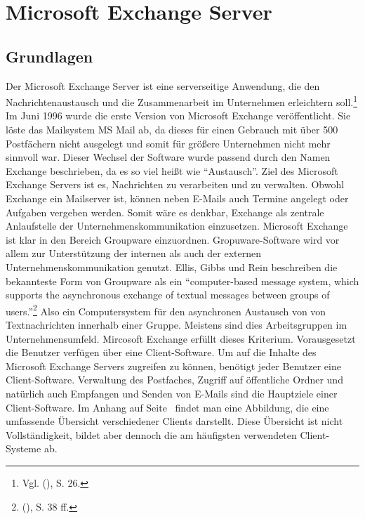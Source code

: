 \section{Microsoft Exchange Server}

\subsection{Grundlagen}
\noindent 
Der  Microsoft Exchange Server ist eine serverseitige Anwendung, die den Nachrichtenaustausch und die Zusammenarbeit im Unternehmen erleichtern soll.\footnote{Vgl. \citeauthor{Joos} (\citeyear{Joos}), S. 26.} Im Juni 1996 wurde die erste Version von Microsoft Exchange veröffentlicht. Sie löste das Mailsystem MS Mail ab, da dieses für einen Gebrauch mit über 500 Postfächern nicht ausgelegt und somit für größere Unternehmen nicht mehr sinnvoll war. Dieser Wechsel der Software wurde passend durch den Namen Exchange beschrieben, da es so viel heißt wie \enquote{Austausch}. Ziel des Microsoft Exchange Servers ist es, Nachrichten zu verarbeiten und zu verwalten. Obwohl Exchange ein Mailserver ist, können neben E-Mails auch Termine angelegt oder Aufgaben vergeben werden. Somit wäre es denkbar, Exchange als zentrale Anlaufstelle der Unternehmenskommunikation einzusetzen.\newline
Microsoft Exchange ist klar in den Bereich Groupware einzuordnen. Gropuware-Software wird vor allem zur Unterstützung der internen als auch der externen Unternehmenskommunikation genutzt. Ellis, Gibbs und Rein beschreiben die bekannteste Form von Groupware als ein 
\enquote{computer-based message system, which supports the asynchronous exchange of textual messages between groups of users.}\footnote{\citeauthor{Ellis} (\citeyear{Ellis}), S. 38 ff.} Also ein Computersystem für den asynchronen Austausch von von Textnachrichten innerhalb einer Gruppe. Meistens sind dies Arbeitsgruppen im Unternehmensumfeld. Mircosoft Exchange erfüllt dieses Kriterium. Vorausgesetzt die Benutzer verfügen über eine Client-Software.\newline
Um auf die Inhalte des Microsoft Exchange Servers zugreifen zu können, benötigt jeder Benutzer eine Client-Software. Verwaltung des Postfaches, Zugriff auf öffentliche Ordner und natürlich auch Empfangen und Senden von E-Mails sind die Hauptziele einer Client-Software. Im Anhang auf Seite~\pageref{Exchange_Verbindungen} findet man eine Abbildung, die eine umfassende Übersicht verschiedener Clients darstellt. Diese Übersicht ist nicht Vollständigkeit, bildet aber dennoch die am häufigsten verwendeten Client-Systeme ab.\newline
